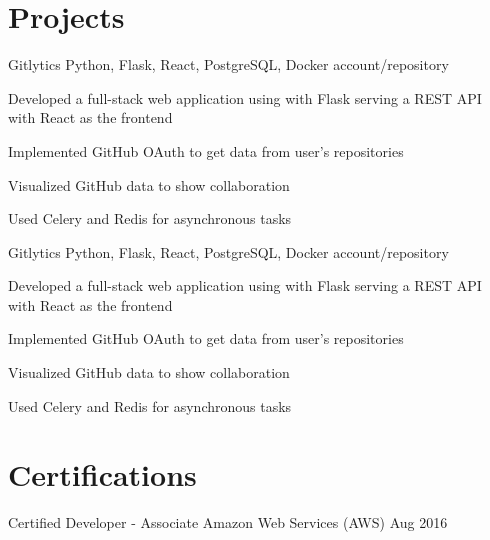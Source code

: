\documentclass[letterpaper]{resume_config}
\begin{document}
\vspace{-10pt}

\section{Projects}

\Project
    {Gitlytics} %
    {Python, Flask, React, PostgreSQL, Docker} %
    {account/repository} %
    {
        \item Developed a full-stack web application using with Flask serving a REST API with React as the frontend
        \item Implemented GitHub OAuth to get data from user’s repositories
        \item Visualized GitHub data to show collaboration
        \item Used Celery and Redis for asynchronous tasks
    }

\Project
    {Gitlytics} %
    {Python, Flask, React, PostgreSQL, Docker} %
    {account/repository} %
    {
        \item Developed a full-stack web application using with Flask serving a REST API with React as the frontend
        \item Implemented GitHub OAuth to get data from user’s repositories
        \item Visualized GitHub data to show collaboration
        \item Used Celery and Redis for asynchronous tasks
    }

\vspace{-8pt}

\section{Certifications}
\vspace{2pt}

\Certification
    {Certified Developer - Associate} %
    {Amazon Web Services (AWS)} %
    {Aug 2016} %
\end{document}
